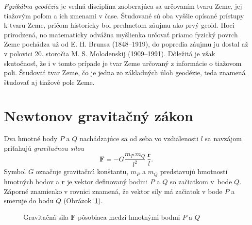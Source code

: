 \documentclass[a4paper, 12pt]{book}
\let\vec\mathbf
\begin{document}
\emph{Fyzikálna geodézia} je vedná disciplína zaoberajúca sa určovaním tvaru 
Zeme, jej tiažovým poľom a ich zmenami v čase.  Študované sú oba vyššie opísané 
prístupy k tvaru Zeme, pričom historicky bol predmetom záujmu ako prvý geoid.  
Hoci prirodzená, no matematicky odvážna myšlienka určovať priamo fyzický povrch 
Zeme pochádza už od E. H. Brunsa (1848--1919), do popredia záujmu ju dostal až 
v polovici 20. storočia M. S. Molodenskij (1909--1991).  Dôležitá je však 
skutočnosť, že i v tomto prípade je tvar Zeme určovaný z informácie o tiažovom 
poli.  Študovať tvar Zeme, čo je jedna zo základných úloh geodézie, teda 
znamená študovať aj tiažové pole Zeme.

\section{Newtonov gravitačný zákon}
\label{sec:newton_law}


Dva hmotné body $P$ a $Q$ nachádzajúce sa od seba vo vzdialenosti $l$ sa 
navzájom priťahujú \emph{gravitačnou silou}
%
\begin{equation}
\label{eq:newton_law}
\vec F = -G \frac{m_P \, m_Q}{l^2} \, \frac{\vec r}{l}{.}
\end{equation}
%
Symbol $G$ označuje gravitačnú konštantu, $m_P$ a $m_Q$ predstavujú hmotnosti 
hmotných bodov a $\vec r$ je vektor definovaný bodmi $P$ a $Q$ so začiatkom 
v~bode $Q$.  Záporné znamienko v rovnici znamená, že vektor sily má začiatok 
v bode $P$ a smeruje do bodu $Q$ (Obrázok~\ref{fig:newton_law}).

\begin{figure}[b]
\centering

\caption{Gravitačná sila $\vec F$ pôsobiaca medzi hmotnými bodmi $P$ a $Q$} 
\label{fig:newton_law}
\end{figure}
\end{document}
